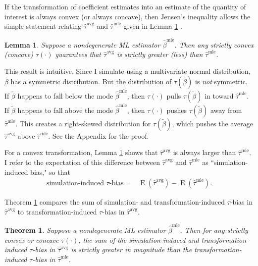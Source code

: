 \documentclass[12pt]{article}
\newtheorem{lemma}{Lemma}
\newtheorem{theorem}{Theorem}
\DeclareMathOperator*{\E}{\text{E}}
\begin{document}
If the transformation of coefficient estimates into an estimate of the quantity of interest is always convex (or always concave), then Jensen's inequality allows the simple statement relating $\hat{\tau}^\text{avg}$ and $\hat{\tau}^{\text{mle}}$ given in Lemma \ref{lem:direction} .

\begin{lemma}\label{lem:direction}
Suppose a nondegenerate ML estimator $\hat{\beta}^\text{mle}$.
Then any strictly convex (concave) $\tau(\cdot)$ guarantees that $\hat{\tau}^{\text{avg}}$ is strictly greater (less) than $\hat{\tau}^\text{mle}$.
\end{lemma}

\noindent This result is intuitive. Since I simulate using a multivariate normal distribution, $\tilde{\beta}$ has a symmetric distribution. But the distribution of $\tau(\tilde{\beta})$ is \emph{not} symmetric. If $\tilde{\beta}$ happens to fall below the mode $\hat{\beta}^\text{mle}$, then $\tau(\cdot)$ pulls $\tau(\tilde{\beta})$ in toward $\hat{\tau}^\text{mle}$.
If $\tilde{\beta}$ happens to fall above the mode $\hat{\beta}^\text{mle}$, then $\tau(\cdot)$ pushes $\tau(\tilde{\beta})$ away from $\hat{\tau}^\text{mle}$. This creates a right-skewed distribution for $\tau(\tilde{\beta})$, which pushes the average $\hat{\tau}^\text{avg}$ above $\hat{\tau}^\text{mle}$. See the Appendix for the proof.

For a convex transformation, Lemma \ref{lem:direction} shows that $\hat{\tau}^\text{avg}$ is always larger than $\hat{\tau}^\text{mle}$. I refer to the expectation of this difference between $\hat{\tau}^\text{avg}$ and $\hat{\tau}^\text{mle}$ as ``simulation-induced bias," so that
\begin{align*}
\text{simulation-induced } \tau\text{-bias} =& \E \left(\hat{\tau}^\text{avg} \right) - \E \left(\hat{\tau}^\text{mle} \right).
\end{align*}

Theorem \ref{thm:direction} compares the sum of simulation- and transformation-induced $\tau$-bias in $\hat{\tau}^\text{avg}$ to transformation-induced $\tau$-bias in $\hat{\tau}^\text{avg}$.

\begin{theorem}\label{thm:direction}
Suppose a nondegenerate ML estimator $\hat{\beta}^\text{mle}$.
Then for any strictly convex or concave $\tau(\cdot)$, the sum of the simulation-induced and transformation-induced $\tau$-bias in $\hat{\tau}^{\text{avg}}$ is strictly greater in magnitude than the transformation-induced $\tau$-bias in $\hat{\tau}^{\text{mle}}$.
\end{theorem}
\end{document}
